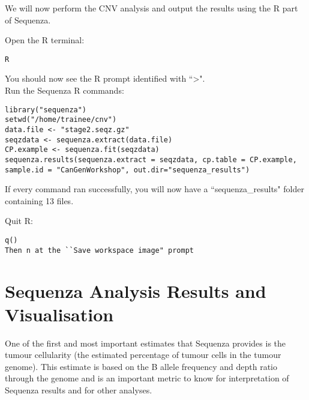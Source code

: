 We will now perform the CNV analysis and output the results using the R part of Sequenza.\\

\begin{steps}
Open the R terminal:
\begin{lstlisting}
R
\end{lstlisting}
\end{steps}

You should now see the R prompt identified with ``\textgreater ".\\

Run the Sequenza R commands:
\begin{steps}
\begin{lstlisting}
library("sequenza")
setwd("/home/trainee/cnv")
data.file <- "stage2.seqz.gz"
seqzdata <- sequenza.extract(data.file)
CP.example <- sequenza.fit(seqzdata)
sequenza.results(sequenza.extract = seqzdata, cp.table = CP.example, sample.id = "CanGenWorkshop", out.dir="sequenza_results")
\end{lstlisting}
\end{steps}

If every command ran successfully, you will now have a ``sequenza\_results" folder containing 13 files.\\

\begin{steps}
Quit R:
\begin{lstlisting}
q()
Then n at the ``Save workspace image" prompt
\end{lstlisting}
\end{steps}


\newpage


\section{Sequenza Analysis Results and Visualisation}

One of the first and most important estimates that Sequenza provides is the tumour cellularity (the estimated percentage of tumour cells in the tumour genome). This estimate is based on the B allele frequency and depth ratio through the genome and is an important metric to know for interpretation of Sequenza results and for other analyses.\\


